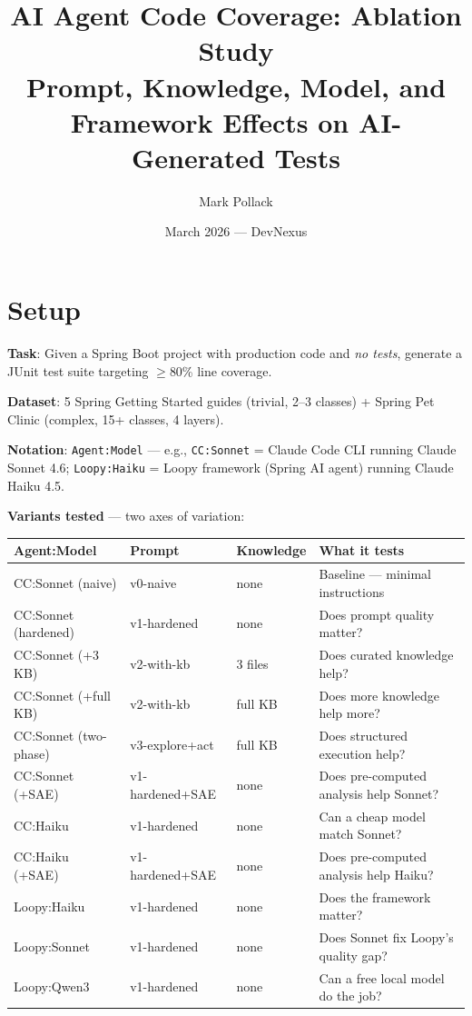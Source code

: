 \documentclass[11pt,a4paper]{article}
\title{AI Agent Code Coverage: Ablation Study\\
\large Prompt, Knowledge, Model, and Framework Effects on AI-Generated Tests}
\author{Mark Pollack}
\date{March 2026 --- DevNexus}
\begin{document}
\maketitle

\section{Setup}

\textbf{Task}: Given a Spring Boot project with production code and \emph{no tests},
generate a JUnit test suite targeting $\geq$80\% line coverage.

\textbf{Dataset}: 5 Spring Getting Started guides (trivial, 2--3 classes) +
Spring Pet Clinic (complex, 15+ classes, 4 layers).

\textbf{Notation}: \texttt{Agent:Model} --- e.g., \texttt{CC:Sonnet} = Claude Code CLI
running Claude Sonnet 4.6; \texttt{Loopy:Haiku} = Loopy framework (Spring AI agent)
running Claude Haiku 4.5.

\textbf{Variants tested} --- two axes of variation:

\begin{table}[H]
\centering
\small
\begin{tabular}{@{}lllp{6cm}@{}}
\toprule
\textbf{Agent:Model} & \textbf{Prompt} & \textbf{Knowledge} & \textbf{What it tests} \\
\midrule
CC:Sonnet (naive)     & v0-naive    & none     & Baseline --- minimal instructions \\
CC:Sonnet (hardened)  & v1-hardened & none     & Does prompt quality matter? \\
CC:Sonnet (+3 KB)     & v2-with-kb  & 3 files  & Does curated knowledge help? \\
CC:Sonnet (+full KB)  & v2-with-kb  & full KB  & Does more knowledge help more? \\
CC:Sonnet (two-phase) & v3-explore+act & full KB & Does structured execution help? \\
CC:Sonnet (+SAE)      & v1-hardened+SAE & none & Does pre-computed analysis help Sonnet? \\
CC:Haiku              & v1-hardened & none     & Can a cheap model match Sonnet? \\
CC:Haiku (+SAE)       & v1-hardened+SAE & none & Does pre-computed analysis help Haiku? \\
Loopy:Haiku           & v1-hardened & none     & Does the framework matter? \\
Loopy:Sonnet          & v1-hardened & none     & Does Sonnet fix Loopy's quality gap? \\
Loopy:Qwen3           & v1-hardened & none     & Can a free local model do the job? \\
\bottomrule
\end{tabular}
\end{table}
\end{document}
